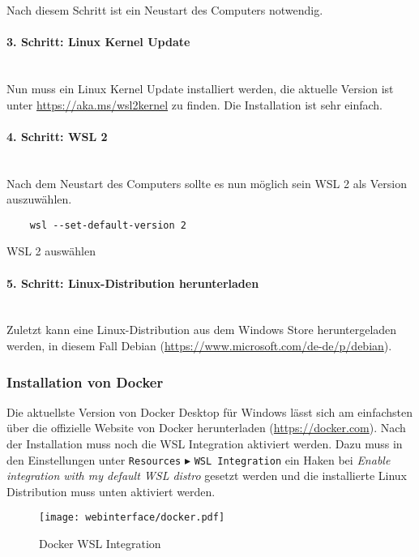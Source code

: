 Nach diesem Schritt ist ein Neustart des Computers notwendig.

\paragraph{3. Schritt: Linux Kernel Update}\mbox{}\\
Nun muss ein Linux Kernel Update installiert werden, die aktuelle Version ist
unter \url{https://aka.ms/wsl2kernel} zu finden. Die Installation ist sehr
einfach.

\paragraph{4. Schritt: WSL 2}\mbox{}\\
Nach dem Neustart des Computers sollte es nun möglich sein WSL 2 als Version
auszuwählen.

\begin{listing}[H]
  \begin{verbatim}
    wsl --set-default-version 2
  \end{verbatim}
  \caption{WSL 2 auswählen}
\end{listing}

\paragraph{5. Schritt: Linux-Distribution herunterladen}\mbox{}\\
Zuletzt kann eine Linux-Distribution aus dem Windows Store heruntergeladen
werden, in diesem Fall Debian (\url{https://www.microsoft.com/de-de/p/debian}).

\subsubsection{Installation von Docker}
Die aktuellste Version von Docker Desktop für Windows lässt sich am einfachsten
über die offizielle Website von Docker herunterladen (\url{https://docker.com}).
Nach der Installation muss noch die WSL Integration aktiviert werden. Dazu muss
in den Einstellungen unter \verb|Resources| $\blacktriangleright$ \verb|WSL Integration|
ein Haken bei \textit{Enable integration with my default WSL distro}
gesetzt werden und die installierte Linux Distribution muss unten aktiviert
werden.

\begin{figure}[H]
  \centering
  \texttt{[image: webinterface/docker.pdf]}
  \caption{Docker WSL Integration}
\end{figure}

